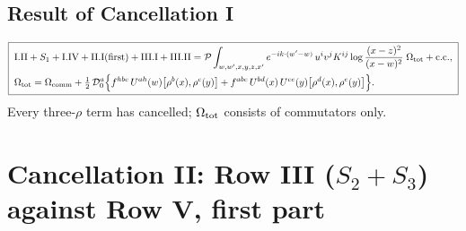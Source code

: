 \documentclass[10pt]{article}
\numberwithin{equation}{section}
\begin{document}
\subsection{Result of Cancellation I}
\begin{align}
\boxed{\;\begin{aligned}
&\text{I.II}+S_{1}+\text{I.IV}+\text{II.I(first)}+\text{III.I}+\text{III.II}=\mathcal{P}\int_{w,w',x,y,z,x'}e^{-ik\cdot(w'-w)}\,u^{i}v^{j}K^{ij}\log\frac{(x-z)^{2}}{(x-w)^{2}}\;\Omega_{\rm tot}+{\rm c.c.},\\
&\Omega_{\rm tot}=\Omega_{\rm comm}+\tfrac12\,\mathcal{D}_{0}^{a}\Big\{f^{hbc}\,U^{ah}(w)\big[\rho^{b}(x),\rho^{c}(y)\big]+f^{abc}\,U^{bd}(x)\,U^{ce}(y)\big[\rho^{d}(x),\rho^{e}(y)\big]\Big\}.
\end{aligned}\;} \label{eq:Omegatot}
\end{align}
Every three-$\rho$ term has cancelled; $\Omega_{\rm tot}$ consists of commutators only.

\section{Cancellation II: Row III ($S_{2}+S_{3}$) against Row V, first part}\label{sec:II}
\end{document}
